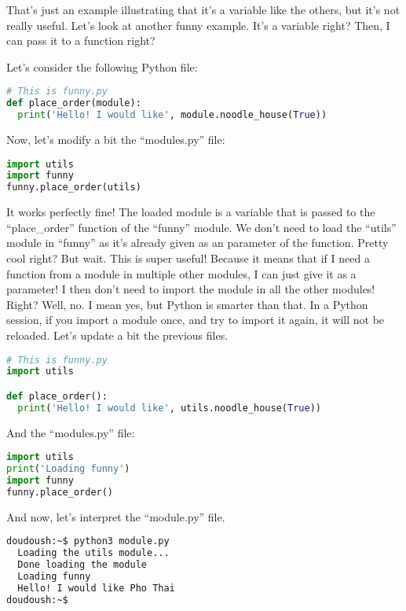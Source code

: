That's just an example illustrating that it's a variable like the others, but it's not really useful.
Let's look at another funny example. It's a variable right? Then, I can pass it to a function right?

Let's consider the following Python file:

\begin{lstlisting}[language=python]
# This is funny.py
def place_order(module):
  print('Hello! I would like', module.noodle_house(True))
\end{lstlisting}

Now, let's modify a bit the ``modules.py'' file:

\begin{lstlisting}[language=python]
import utils
import funny
funny.place_order(utils)
\end{lstlisting}

It works perfectly fine! The loaded module is a variable that is passed to the ``place\_order''
function of the ``funny'' module. We don't need to load the ``utils'' module in ``funny'' as
it's already given as an parameter of the function. Pretty cool right? But wait. This is super
useful! Because it means that if I need a function from a module in multiple other modules,
I can just give it as a parameter! I then don't need to import the module in all the other modules!
Right? Well, no. I mean yes, but Python is smarter than that. In a Python session, if you import
a module once, and try to import it again, it will not be reloaded. Let's update a bit the previous
files.

\begin{lstlisting}[language=python]
# This is funny.py
import utils

def place_order():
  print('Hello! I would like', utils.noodle_house(True))
\end{lstlisting}

And the ``modules.py'' file:

\begin{lstlisting}[language=python]
import utils
print('Loading funny')
import funny
funny.place_order()
\end{lstlisting}

And now, let's interpret the ``module.py'' file.

\begin{lstlisting}[language=bash]
doudoush:~$ python3 module.py
  Loading the utils module...
  Done loading the module
  Loading funny
  Hello! I would like Pho Thai
doudoush:~$
\end{lstlisting}

